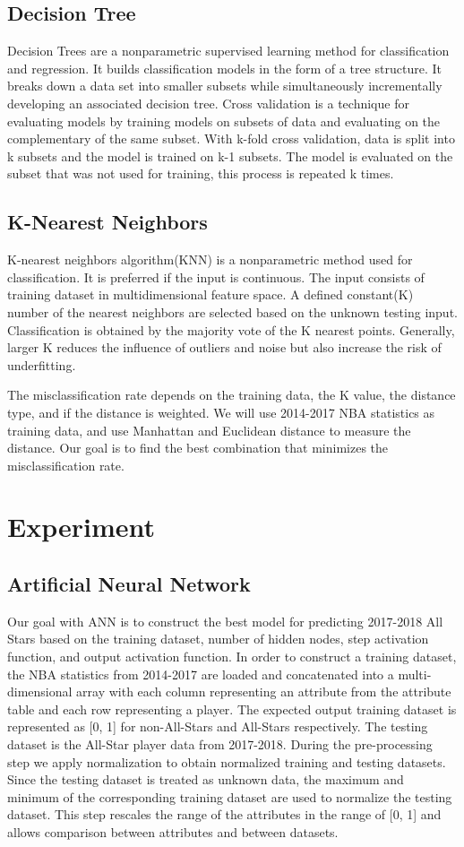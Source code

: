 \documentclass{article}
\begin{document}
\subsection{Decision Tree}
Decision Trees are a nonparametric supervised learning method for classification and regression. It builds classification models in the form of a tree structure. It breaks down a data set into smaller subsets while simultaneously incrementally developing an associated decision tree. Cross validation is a technique for evaluating models by training models on subsets of data and evaluating on the complementary of the same subset. With k-fold cross validation, data is split into k subsets and the model is trained on k-1 subsets. The model is evaluated on the subset that was not used for training, this process is repeated k times. 
  
\subsection{K-Nearest Neighbors}
K-nearest neighbors algorithm(KNN) is a nonparametric method used for classification. It is preferred if the input is continuous. The input consists of training dataset in multidimensional feature space. A defined constant(K) number of the nearest neighbors are selected based on the unknown testing input. Classification is obtained by the majority vote of the K nearest points. Generally, larger K reduces the influence of outliers and noise but also increase the risk of underfitting.

The misclassification rate depends on the training data, the K value, the distance type, and if the distance is weighted. We will use 2014-2017 NBA statistics as training data, and use Manhattan and Euclidean distance to measure the distance. Our goal is to find the best combination that minimizes the misclassification rate. 

\section{Experiment}
\subsection{Artificial Neural Network}
Our goal with ANN is to construct the best model for predicting 2017-2018 All Stars based on the training dataset, number of hidden nodes, step activation function, and output activation function. In order to construct a training dataset, the NBA statistics from 2014-2017 are loaded and concatenated into a multi-dimensional array with each column representing an attribute from the attribute table and each row representing a player. The expected output training dataset is represented as [0, 1] for non-All-Stars and All-Stars respectively. The testing dataset is the All-Star player data from 2017-2018. During the pre-processing step we apply normalization to obtain normalized training and testing datasets. Since the testing dataset is treated as unknown data, the maximum and minimum of the corresponding training dataset are used to normalize the testing dataset. This step rescales the range of the attributes in the range of [0, 1] and allows comparison between attributes and between datasets. 
\end{document}
